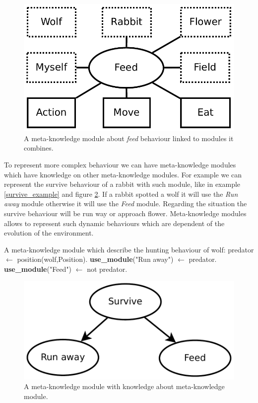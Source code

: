 \documentclass{aamas2012}
\begin{document}
	\begin{figure}
		\centering
		\includegraphics[keepaspectratio=true, scale=0.4]{feed.pdf}
		\caption
		{
			\label{feed_figure}
			A meta-knowledge module about \textit{feed} behaviour linked to modules it combines.
		}
	\end{figure}
	
	To represent more complex behaviour we can have meta-knowledge modules which have knowledge on other meta-knowledge modules.
	For example we can represent the survive behaviour of a rabbit with such module, like in example \ref{survive_example} and figure \ref{survive_figure}.
	If a rabbit spotted a wolf it will use the \emph{Run away} module otherwise it will use the \emph{Feed} module.
	Regarding the situation the survive behaviour will be run way or approach flower.
	Meta-knowledge modules allows to represent such dynamic behaviours which are dependent of the evolution of the environment.
	
	\begin{example}
		\label{survive_example}
		A meta-knowledge module which describe the hunting behaviour of wolf:\newline
		\newline
		predator $\leftarrow$ position(wolf,Position).\newline
		\textbf{use\_module}("Run away") $\leftarrow$ predator.\newline
		\textbf{use\_module}("Feed") $\leftarrow$ not predator.\newline
	\end{example}
	
	\begin{figure}
		\centering
		\includegraphics[keepaspectratio=true, scale=0.4]{survive.pdf}
		\caption
		{
			\label{survive_figure}
			A meta-knowledge module with knowledge about meta-knowledge module.
		}
	\end{figure}
	
\end{document}
